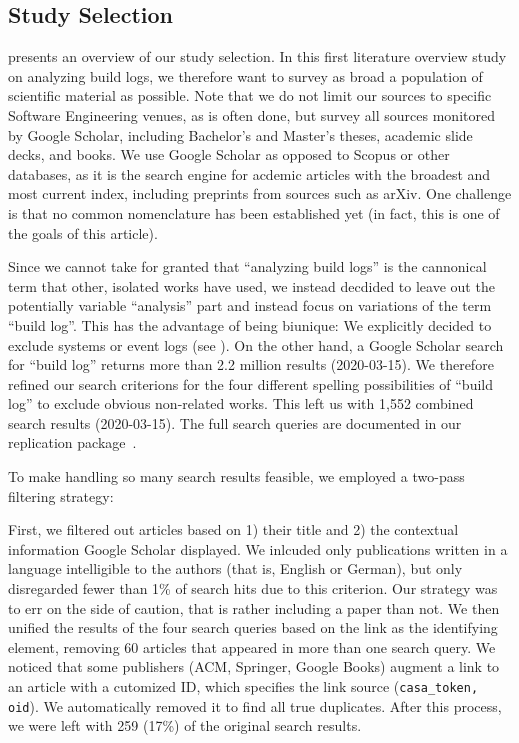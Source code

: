 \subsection{Study Selection}
 presents an overview of our study selection.
In this first literature overview study on analyzing build logs, we
therefore want to survey as broad a population of scientific material
as possible. Note that we do not limit our sources to specific
Software Engineering venues, as is often done, but survey all sources
monitored by Google Scholar, including Bachelor's and Master's theses,
academic slide decks, and books. We use Google Scholar as opposed to
Scopus or other databases, as it is the search engine for acdemic
articles with the broadest and most current index, including preprints
from sources such as arXiv. One challenge is that no common
nomenclature has been established yet (in fact, this is one of the
goals of this article).

Since we cannot take for granted that ``analyzing build logs'' is the
cannonical term that other, isolated works have used, we instead
decdided to leave out the potentially variable ``analysis'' part and
instead focus on variations of the term ``build log''. This has the
advantage of being biunique: We explicitly decided to exclude systems
or event logs (see ). On the other hand, a Google Scholar
search for ``build log'' returns more than 2.2 million results
(2020-03-15). We therefore refined our search criterions for the four
different spelling possibilities of ``build log'' to exclude obvious
non-related works. This left us with 1,552 combined search results
(2020-03-15). The full search queries are documented in our replication
package~\cite{brandt2020chunk-replication}.

To make handling so many search results feasible, we employed a
two-pass filtering strategy:

First, we filtered out articles based on 1) their title and 2) the
contextual information Google Scholar displayed. We inlcuded only
publications written in a language intelligible to the authors (that
is, English or German), but only disregarded fewer than 1\% of search
hits due to this criterion. Our strategy was to err on the side of
caution, that is rather including a paper than not. We then unified
the results of the four search queries based on the link as the
identifying element, removing 60 articles that appeared in more than
one search query. We noticed that some publishers (ACM, Springer,
Google Books) augment a link to an article with a cutomized ID, which
specifies the link source ({\tt casa\_token, oid}).  We automatically
removed it to find all true duplicates. After this process, we were
left with 259 (17\%) of the original search results.

